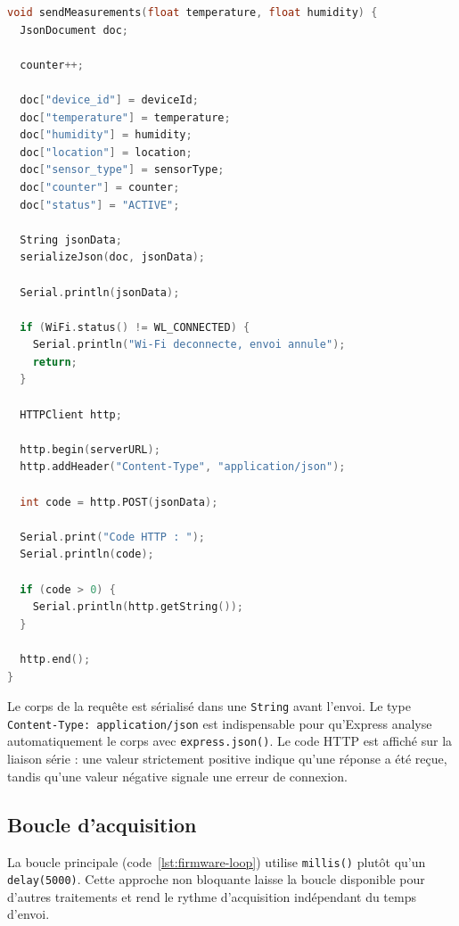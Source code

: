 \documentclass[11pt,a4paper]{article}
\begin{document}
\begin{lstlisting}[language=C++,firstnumber=24,
  caption={Construction et envoi d'une mesure (\texttt{esp32/main.c}).},
  label={lst:firmware-send}]
void sendMeasurements(float temperature, float humidity) {
  JsonDocument doc;

  counter++;

  doc["device_id"] = deviceId;
  doc["temperature"] = temperature;
  doc["humidity"] = humidity;
  doc["location"] = location;
  doc["sensor_type"] = sensorType;
  doc["counter"] = counter;
  doc["status"] = "ACTIVE";

  String jsonData;
  serializeJson(doc, jsonData);

  Serial.println(jsonData);

  if (WiFi.status() != WL_CONNECTED) {
    Serial.println("Wi-Fi deconnecte, envoi annule");
    return;
  }

  HTTPClient http;

  http.begin(serverURL);
  http.addHeader("Content-Type", "application/json");

  int code = http.POST(jsonData);

  Serial.print("Code HTTP : ");
  Serial.println(code);

  if (code > 0) {
    Serial.println(http.getString());
  }

  http.end();
}
\end{lstlisting}

Le corps de la requête est sérialisé dans une \texttt{String} avant l'envoi. Le type
\texttt{Content-Type: application/json} est indispensable pour qu'Express analyse
automatiquement le corps avec \texttt{express.json()}. Le code HTTP est affiché sur la liaison
série : une valeur strictement positive indique qu'une réponse a été reçue, tandis qu'une
valeur négative signale une erreur de connexion.

\subsection{Boucle d'acquisition}

La boucle principale (code~\ref{lst:firmware-loop}) utilise \texttt{millis()} plutôt qu'un
\texttt{delay(5000)}. Cette approche non bloquante laisse la boucle disponible pour d'autres
traitements et rend le rythme d'acquisition indépendant du temps d'envoi.
\end{document}

